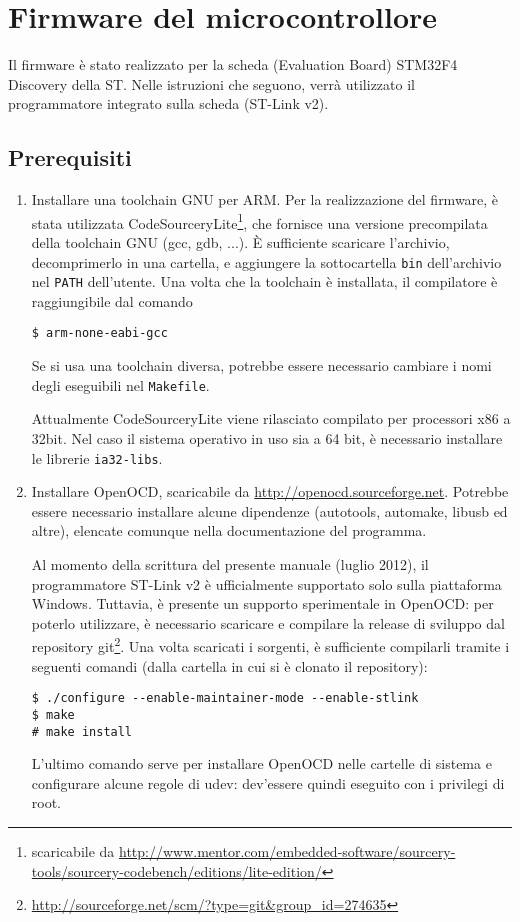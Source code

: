 \section{Firmware del microcontrollore}

Il firmware è stato realizzato per la scheda (Evaluation Board) STM32F4 Discovery della ST. Nelle istruzioni che seguono, verrà utilizzato il programmatore integrato sulla scheda (ST-Link v2).

\subsection*{Prerequisiti}
\begin{enumerate}
\item Installare una toolchain GNU per ARM. Per la realizzazione del firmware, è stata utilizzata  CodeSourceryLite\footnote{scaricabile da \url{http://www.mentor.com/embedded-software/sourcery-tools/sourcery-codebench/editions/lite-edition/}}, che fornisce una versione precompilata della toolchain GNU (gcc, gdb, ...). È sufficiente scaricare l'archivio, decomprimerlo in una cartella, e aggiungere la sottocartella \verb|bin| dell'archivio nel \verb|PATH| dell’utente. Una volta che la toolchain è installata, il compilatore è raggiungibile dal comando 
\begin{verbatim}
$ arm-none-eabi-gcc
\end{verbatim}
Se si usa una toolchain diversa, potrebbe essere necessario cambiare i nomi degli eseguibili nel \verb|Makefile|.

\begin{nota}
Attualmente CodeSourceryLite viene rilasciato compilato per processori x86 a 32bit. Nel caso il sistema operativo in uso sia a 64 bit, è necessario installare le librerie \verb|ia32-libs|.
\end{nota}

\item Installare OpenOCD, scaricabile da \url{http://openocd.sourceforge.net}. Potrebbe essere necessario installare alcune dipendenze (autotools, automake, libusb ed altre), elencate comunque nella documentazione del programma.

\begin{nota}
Al momento della scrittura del presente manuale (luglio 2012), il programmatore ST-Link v2 è ufficialmente supportato solo sulla piattaforma Windows. Tuttavia, è presente un supporto sperimentale in OpenOCD: per poterlo utilizzare, è necessario scaricare e compilare la release di sviluppo dal repository git\footnote{\url{http://sourceforge.net/scm/?type=git&group_id=274635}}. Una volta scaricati i sorgenti, è sufficiente compilarli tramite i seguenti comandi  (dalla cartella in cui si è clonato il repository):
\begin{verbatim}
$ ./configure --enable-maintainer-mode --enable-stlink
$ make
# make install
\end{verbatim}
L'ultimo comando serve per installare OpenOCD nelle cartelle di sistema e configurare alcune regole di udev: dev'essere quindi eseguito con i privilegi di root.
\end{nota}


\end{enumerate}
